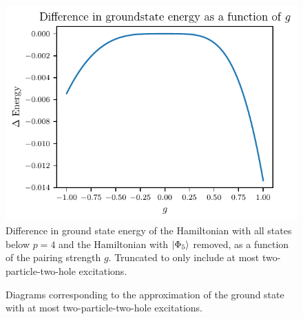 \begin{figure}[htbp]
    \centering
    \includegraphics{figures/c_diff_ground_state_energy.pdf}
    \caption{
        Difference in ground state energy of the Hamiltonian with all states below $p=4$ and the Hamiltonian with $\lvert\Phi_5\rangle$ removed, as a function of the pairing strength $g$.
        Truncated to only include at most two-particle-two-hole excitations.\label{fig:c_diff_groundstate}
    }
\end{figure}



\begin{figure}
    \centering
    
    \caption{
        Diagrams corresponding to the approximation of the ground state with at most two-particle-two-hole excitations.\label{fig:2p2h}
    }
\end{figure}
